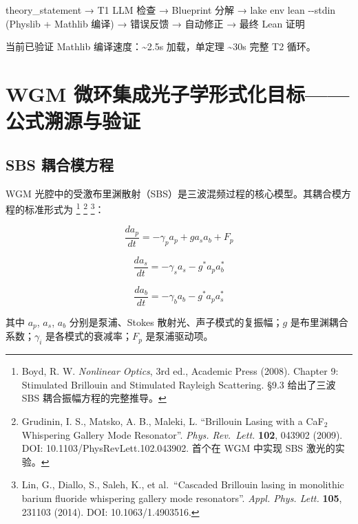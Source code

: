 \documentclass[
  11pt,
  a4paper,
]{ctexrep}
\newenvironment{Shaded}{\begin{snugshade}}{\end{snugshade}}
\newcommand{\NormalTok}[1]{\textcolor[rgb]{0.00,0.23,0.31}{#1}}
\begin{document}
\begin{Shaded}
\begin{Highlighting}[]
\NormalTok{theory\_statement → T1 LLM 检查 → Blueprint 分解}
\NormalTok{  → lake env lean {-}{-}stdin (Physlib + Mathlib 编译)}
\NormalTok{  → 错误反馈 → 自动修正 → 最终 Lean 证明}
\end{Highlighting}
\end{Shaded}

当前已验证 Mathlib 编译速度：\textasciitilde2.5s 加载，单定理
\textasciitilde30s 完整 T2 循环。


\chapter{WGM
微环集成光子学形式化目标------公式溯源与验证}\label{wgm-ux5faeux73afux96c6ux6210ux5149ux5b50ux5b66ux5f62ux5f0fux5316ux76eeux6807ux516cux5f0fux6eafux6e90ux4e0eux9a8cux8bc1}

\section{SBS 耦合模方程}\label{sbs-ux8026ux5408ux6a21ux65b9ux7a0b}

WGM
光腔中的受激布里渊散射（SBS）是三波混频过程的核心模型。其耦合模方程的标准形式为
\footnote{Boyd, R. W. \emph{Nonlinear Optics}, 3rd ed., Academic Press
  (2008). Chapter 9: Stimulated Brillouin and Stimulated Rayleigh
  Scattering. §9.3 给出了三波 SBS 耦合振幅方程的完整推导。} \footnote{Grudinin,
  I. S., Matsko, A. B., Maleki, L. ``Brillouin Lasing with a CaF\(_2\)
  Whispering Gallery Mode Resonator''. \emph{Phys. Rev.~Lett.}
  \textbf{102}, 043902 (2009). DOI: 10.1103/PhysRevLett.102.043902.
  首个在 WGM 中实现 SBS 激光的实验。} \footnote{Lin, G., Diallo, S.,
  Saleh, K., et al.~``Cascaded Brillouin lasing in monolithic barium
  fluoride whispering gallery mode resonators''. \emph{Appl. Phys.
  Lett.} \textbf{105}, 231103 (2014). DOI: 10.1063/1.4903516.}：

\[
\frac{da_p}{dt} = -\gamma_p a_p + g a_s a_b + F_p
\]

\[
\frac{da_s}{dt} = -\gamma_s a_s - g^* a_p a_b^*
\]

\[
\frac{da_b}{dt} = -\gamma_b a_b - g^* a_p a_s^*
\]

其中 \(a_p\), \(a_s\), \(a_b\) 分别是泵浦、Stokes
散射光、声子模式的复振幅；\(g\) 是布里渊耦合系数；\(\gamma_i\)
是各模式的衰减率；\(F_p\) 是泵浦驱动项。
\end{document}
